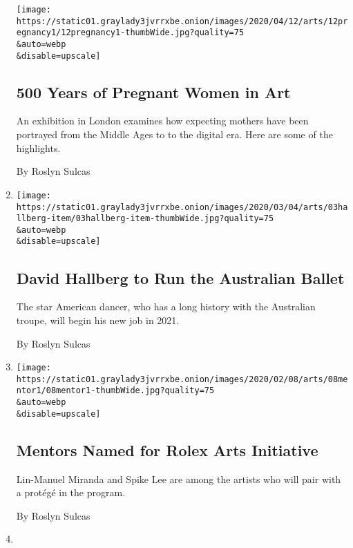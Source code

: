 \begin{enumerate}
  \texttt{[image: https://static01.graylady3jvrrxbe.onion/images/2020/04/12/arts/12pregnancy1/12pregnancy1-thumbWide.jpg?quality=75\\\&auto=webp\\\&disable=upscale]}

  \hypertarget{500-years-of-pregnant-women-in-art}{%
  \subsection{500 Years of Pregnant Women in
  Art}\label{500-years-of-pregnant-women-in-art}}

  An exhibition in London examines how expecting mothers have been
  portrayed from the Middle Ages to to the digital era. Here are some of
  the highlights.

  By Roslyn Sulcas
\item
  \href{/2020/03/02/arts/dance/david-hallberg-artistic-director-australian-ballet.html}{}

  \texttt{[image: https://static01.graylady3jvrrxbe.onion/images/2020/03/04/arts/03hallberg-item/03hallberg-item-thumbWide.jpg?quality=75\\\&auto=webp\\\&disable=upscale]}

  \hypertarget{david-hallberg-to-run-the-australian-ballet}{%
  \subsection{David Hallberg to Run the Australian
  Ballet}\label{david-hallberg-to-run-the-australian-ballet}}

  The star American dancer, who has a long history with the Australian
  troupe, will begin his new job in 2021.

  By Roslyn Sulcas
\item
  \href{/2020/02/08/arts/rolex-mentor-arts.html}{}

  \texttt{[image: https://static01.graylady3jvrrxbe.onion/images/2020/02/08/arts/08mentor1/08mentor1-thumbWide.jpg?quality=75\\\&auto=webp\\\&disable=upscale]}

  \hypertarget{mentors-named-for-rolex-arts-initiative}{%
  \subsection{Mentors Named for Rolex Arts
  Initiative}\label{mentors-named-for-rolex-arts-initiative}}

  Lin-Manuel Miranda and Spike Lee are among the artists who will pair
  with a protégé in the program.

  By Roslyn Sulcas
\item
  \href{/2020/01/31/arts/dance/adolphe-binder-pina-bausch-company.html}{}


\end{enumerate}
